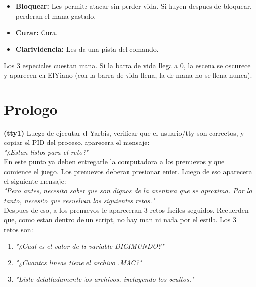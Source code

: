 \documentclass[a4paper,10pt]{article}
\begin{document}
	\begin{itemize}
		\item \textbf{Bloquear:} Les permite atacar sin perder vida. Si huyen despues de bloquear, perderan el mana gastado.
		\item \textbf{Curar:} Cura.
		\item \textbf{Clarividencia:} Les da una pista del comando.
	\end{itemize}	 
	\hspace{0.4cm} Los 3 especiales cuestan mana. Si la barra de vida llega a 0, la escena se oscurece y aparecen en ElYiano (con la barra de vida llena, la de mana no se llena nunca).
	
	
	
\section{Prologo}
	\textbf{(tty1)} Luego de ejecutar el Yarbis, verificar que el usuario/tty son correctos, y copiar el PID del proceso, aparecera el mensaje: \\
	
	\hspace{-1cm}\textit{"¿Estan listos para el reto?"}\\
	
	En este punto ya deben entregarle la computadora a los prenuevos y que comience el juego. Los prenuevos deberan presionar enter. Luego de eso aparecera el siguiente mensaje:\\
	
	\hspace{-1cm}\textit{"Pero antes, necesito saber que son dignos de la aventura que se aproxima. Por lo tanto, necesito que resuelvan los siguientes retos."}\\
	
	Despues de eso, a los prenuevos le apareceran 3 retos faciles seguidos. Recuerden que, como estan dentro de un script, no hay man ni nada por el estilo. Los 3 retos son:\\
	
	\begin{enumerate}
		\item \textit{"¿Cual es el valor de la variable DIGIMUNDO?"}
		\item \textit{"¿Cuantas lineas tiene el archivo .MAC?"}
		\item \textit{"Liste detalladamente los archivos, incluyendo los ocultos."}		
	\end{enumerate}
	
\end{document}
